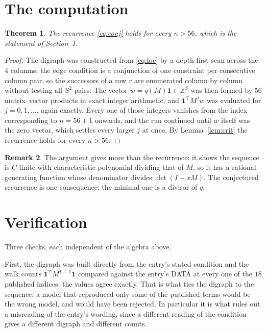 \documentclass[11pt,a4paper]{article}
\theoremstyle{plain}
\newtheorem{theorem}{Theorem}
\theoremstyle{definition}
\newtheorem{remark}[theorem]{Remark}
\begin{document}
\section{The computation}

\begin{theorem}
The recurrence \eqref{eq:conj} holds for every $n>56$, which is the statement of
Section~1.
\end{theorem}

\begin{proof}
The digraph was constructed from \eqref{eq:loc} by a depth-first scan across the $4$
columns: the edge condition is a conjunction of one constraint per consecutive column
pair, so the successors of a row $r$ are enumerated column by column without testing all
$S^2$ pairs. The vector $w=q(M)\mathbf{1}\in\mathbb{Z}^{S}$ was then formed by $56$
matrix--vector products in exact integer arithmetic, and $\mathbf{1}^{\!\top}M^{j}w$ was
evaluated for $j=0,1,\dots$, again exactly. Every one of those integers vanishes from the
index corresponding to $n=56+1$ onwards, and the run continued until $w$ itself was the
zero vector, which settles every larger $j$ at once. By Lemma~\ref{lem:crit} the recurrence
holds for every $n>56$.
\end{proof}

\begin{remark}
The argument gives more than the recurrence: it shows the sequence is $C$-finite with
characteristic polynomial dividing that of $M$, so it has a rational generating function
whose denominator divides $\det(I-xM)$. The conjectured recurrence is one consequence; the
minimal one is a divisor of $q$.
\end{remark}

\section{Verification}

Three checks, each independent of the algebra above.

First, the digraph was built directly from the entry's stated condition and the walk counts
$\mathbf{1}^{\!\top}M^{L-1}\mathbf{1}$ compared against the entry's DATA at
every one of the $18$ published indices; the values agree exactly. That is what ties
the digraph to the sequence: a model that reproduced only some of the published terms would
be the wrong model, and would have been rejected. In particular it is what rules out a
misreading of the entry's wording, since a different reading of the condition gives a
different digraph and different counts.
\end{document}
